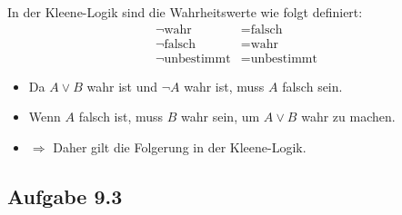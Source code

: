\documentclass{article}
\begin{document}
In der Kleene-Logik sind die Wahrheitswerte wie folgt definiert:
\begin{align*}
\neg \text{wahr} &= \text{falsch} \\
\neg \text{falsch} &= \text{wahr} \\
\neg \text{unbestimmt} &= \text{unbestimmt}
\end{align*}

\begin{itemize}
    \item Da \( A \lor B \) wahr ist und \( \neg A \) wahr ist, muss \( A \) falsch sein.
    \item Wenn \( A \) falsch ist, muss \( B \) wahr sein, um \( A \lor B \) wahr zu machen.
    \item $\Rightarrow$ Daher gilt die Folgerung in der Kleene-Logik.
\end{itemize}

\subsection*{Aufgabe 9.3}
\end{document}
